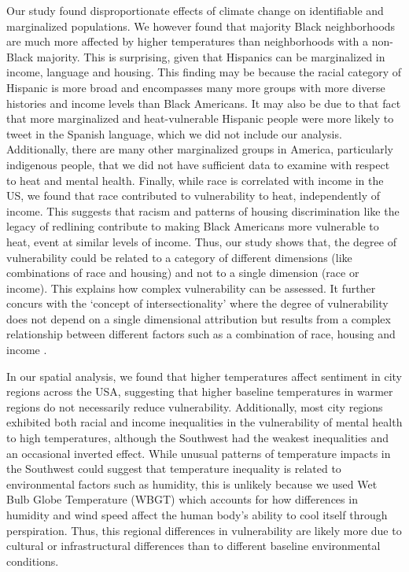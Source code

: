 \documentclass[fleqn,10pt]{wlscirep}
\begin{document}
Our study found disproportionate effects of climate change on identifiable and marginalized populations. We however found that majority Black neighborhoods are much more affected by higher temperatures than neighborhoods with a non-Black majority. This is surprising, given that Hispanics can be marginalized in income, language and housing. This finding may be because the racial category of Hispanic is more broad and encompasses many more groups with more diverse histories and income levels than Black Americans. It may also be due to that fact that more marginalized and heat-vulnerable Hispanic people were more likely to tweet in the Spanish language, which we did not include our analysis.  Additionally, there are many other marginalized groups in America, particularly indigenous people, that we did not have sufficient data to examine with respect to heat and mental health.  Finally, while race is correlated with income in the US, we found that race contributed to vulnerability to heat, independently of income. This suggests that racism and patterns of housing discrimination like the legacy of redlining contribute to making Black Americans more vulnerable to heat, event at similar levels of income. Thus, our study shows that, the degree of vulnerability could be related to a category of different dimensions (like combinations of race and housing) and not to a single dimension (race or income). This explains how complex vulnerability can be assessed. It further concurs with the ‘concept of intersectionality’ where the degree of vulnerability does not depend on a single dimensional attribution but results from a complex relationship between different factors such as a combination of race, housing and income \cite{Kuran2020Nov}. 

In our spatial analysis, we found that higher temperatures affect sentiment in city regions across the USA, suggesting that higher baseline temperatures in warmer regions do not necessarily reduce vulnerability. Additionally, most city regions exhibited both racial and income inequalities in the vulnerability of mental health to high temperatures, although the Southwest had the weakest inequalities and an occasional inverted effect.  While unusual patterns of temperature impacts in the Southwest could suggest that temperature inequality is related to environmental factors such as humidity, this is unlikely because we used Wet Bulb Globe Temperature (WBGT) which accounts for how differences in humidity and wind speed affect the human body's ability to cool itself through perspiration. Thus, this regional differences in vulnerability are likely more due to cultural or infrastructural differences than to different baseline environmental conditions.
\end{document}
